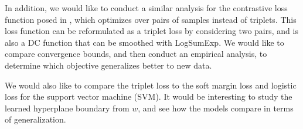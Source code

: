 \documentclass[11pt]{article}
\begin{document}
In addition, we would like to conduct a similar analysis for the contrastive loss function posed in \cite{hadsell_dimensionality_2006}, which optimizes over pairs of samples instead of triplets. This loss function can be reformulated as a triplet loss by considering two pairs, and is also a DC function that can be smoothed with LogSumExp. We would like to compare convergence bounds, and then conduct an empirical analysis, to determine which objective generalizes better to new data.

We would also like to compare the triplet loss to the soft margin loss and logistic loss for the support vector machine (SVM). It would be interesting to study the learned hyperplane boundary from $w$, and see how the models compare in terms of generalization.





\end{document}
